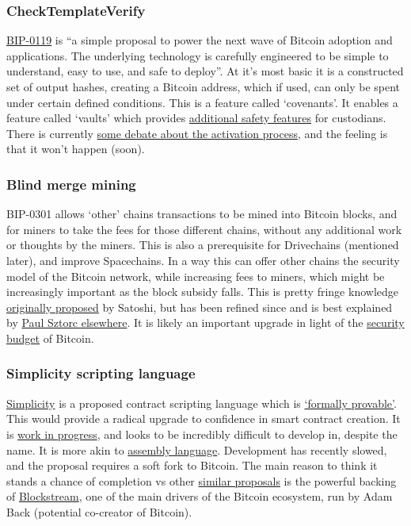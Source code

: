 \subsubsection{CheckTemplateVerify}
\href{https://utxos.org/}{BIP-0119} is ``a simple proposal to power the next wave of Bitcoin adoption and applications. The underlying technology is carefully engineered to be simple to understand, easy to use, and safe to deploy''. At it's most basic it is a constructed set of output hashes, creating a Bitcoin address, which if used, can only be spent under certain defined conditions. This is a feature called `covenants'. It enables a feature called `vaults' which provides \href{https://github.com/jamesob/simple-ctv-vault/blob/7dd6c4ca25debb2140cdefb79b302c65d1b24937/README.md}{additional safety features} for custodians. There is currently \href{https://blog.bitmex.com/op_ctv-summer-softfork-shenanigans/}{some debate about the activation process}, and the feeling is that it won't happen (soon).
\subsubsection{Blind merge mining}
BIP-0301 allows `other' chains transactions to be mined into Bitcoin blocks, and for miners to take the fees for those different chains, without any additional work or thoughts by the miners. This is also a prerequisite for Drivechains (mentioned later), and improve Spacechains. In a way this can offer other chains the security model of the Bitcoin network, while increasing fees to miners, which might be increasingly important as the block subsidy falls. This is pretty fringe knowledge \href{https://bitcointalk.org/index.php?topic=1790.msg28696#msg28696}{originally proposed} by Satoshi, but has been refined since and is best explained by \href{https://www.youtube.com/watch?v=xweFaw69EyA}{Paul Sztorc elsewhere}. It is likely an important upgrade in light of the \href{https://www.truthcoin.info/blog/security-budget/}{security budget} of Bitcoin.
\subsubsection{Simplicity scripting language}
\href{https://blockstream.com/simplicity.pdf}{Simplicity} is a proposed contract scripting language which is \href{https://coq.inria.fr/}{`formally provable'}. This would provide a radical upgrade to confidence in smart contract creation. It is \href{https://github.com/ElementsProject/simplicity/blob/pdf/Simplicity-TR.pdf}{work in progress}, and looks to be incredibly difficult to develop in, despite the name. It is more akin to \href{https://en.wikipedia.org/wiki/Assembly_language}{assembly language}. Development has recently slowed, and the proposal requires a soft fork to Bitcoin. The main reason to think it stands a chance of completion vs other \href{https://lists.linuxfoundation.org/pipermail/bitcoin-dev/2022-March/020036.html}{similar proposals} is the powerful backing of \href{https://blockstream.com/}{Blockstream}, one of the main drivers of the Bitcoin ecosystem, run by Adam Back (potential co-creator of Bitcoin). 
